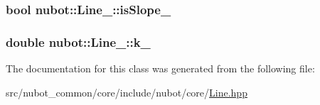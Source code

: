 \hypertarget{classnubot_1_1Line___a24e8175ccedd35f48fea06f34f0e4ee6}{
\subsubsection[{is\-Slope\-\_\-}]{\setlength{\rightskip}{0pt plus 5cm}bool nubot\-::\-Line\-\_\-\-::is\-Slope\-\_\-}}\label{classnubot_1_1Line___a24e8175ccedd35f48fea06f34f0e4ee6}
\hypertarget{classnubot_1_1Line___a569a0bc980db41b36ad5471811b8dc87}{
\subsubsection[{k\-\_\-}]{\setlength{\rightskip}{0pt plus 5cm}double nubot\-::\-Line\-\_\-\-::k\-\_\-}}\label{classnubot_1_1Line___a569a0bc980db41b36ad5471811b8dc87}


The documentation for this class was generated from the following file\-:\begin{DoxyCompactItemize}
\item 
src/nubot\-\_\-common/core/include/nubot/core/\hyperlink{Line_8hpp}{Line.\-hpp}\end{DoxyCompactItemize}
